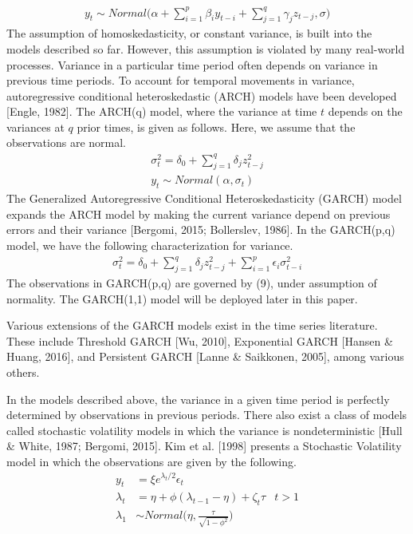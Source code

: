 \documentclass[12pt,letterpaper,reqno,fleqn]{article}
\begin{document}
\begin{align}
y_t \sim Normal \big(\alpha + \sum_{i=1}^p \beta_i y_{t-i} + \sum_{j=1}^q \gamma_j z_{t-j}, \sigma \big)
\end{align}
\hspace{.5cm} The assumption of homoskedasticity, or constant variance, is built into the models described so far. However, this assumption is violated by many real-world processes. Variance in a particular time period often depends on variance in previous time periods. To account for temporal movements in variance, autoregressive conditional heteroskedastic (ARCH) models have been developed [Engle, 1982].
The ARCH(q) model, where the variance at time $t$ depends on the variances at $q$ prior times, is given as follows. Here, we assume that the observations are normal.
\begin{align}
\sigma^2_t = \delta_0 + \sum_{j=1}^q \delta_j z_{t-j}^2 \\
y_t \sim Normal(\alpha, \sigma_t) 
\end{align}
\hspace{.5cm} The Generalized Autoregressive Conditional Heteroskedasticity (GARCH) model expands the ARCH model by making the current variance depend on previous errors and their variance [Bergomi, 2015; Bollerslev, 1986]. In the GARCH(p,q) model, we have the following characterization for variance.
\begin{align}
\sigma^2_t = \delta_0 + \sum_{j=1}^q \delta_j z_{t-j}^2  + \sum_{i=1}^p \epsilon_i \sigma^2_{t-i}
\end{align}
The observations in GARCH(p,q) are governed by (9), under assumption of normality. The GARCH(1,1) model will be deployed later in this paper. 

Various extensions of the GARCH models exist in the time series literature. These include Threshold GARCH [Wu, 2010], Exponential GARCH [Hansen \& Huang, 2016], and Persistent GARCH [Lanne \& Saikkonen, 2005], among various others.

In the models described above, the variance in a given time period is perfectly determined by observations in previous periods. There also exist a class of models called stochastic volatility models in which the variance is nondeterministic [Hull \& White, 1987; Bergomi, 2015].
Kim et al. [1998] presents a Stochastic Volatility model in which the observations are given by the following.
\begin{align}
y_t &= \xi e^{\lambda_t/2} \epsilon_t \\
\lambda_t &= \eta + \phi(\lambda_{t-1} - \eta) + \zeta_t \tau & t>1 \\
\lambda_1 &\sim Normal \big( \eta, \frac{\tau}{\sqrt{1 - \phi^2}} \big)
\end{align}
\end{document}
